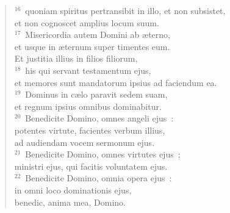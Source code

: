 \begin{verse}
${}^{16}$~quoniam spiritus pertransibit in illo, et non subsistet,\\ et non cognoscet amplius locum suum.\\
${}^{17}$~Misericordia autem Domini ab \ae terno,\\ et usque in \ae ternum super timentes eum.\\ Et justitia illius in filios filiorum,\\
${}^{18}$~his qui servant testamentum ejus,\\ et memores sunt mandatorum ipsius ad faciendum ea.\\
${}^{19}$~Dominus in c\ae lo paravit sedem suam,\\ et regnum ipsius omnibus dominabitur.\\
${}^{20}$~Benedicite Domino, omnes angeli ejus~:\\ potentes virtute, facientes verbum illius,\\ ad audiendam vocem sermonum ejus.\\
${}^{21}$~Benedicite Domino, omnes virtutes ejus~;\\ ministri ejus, qui facitis voluntatem ejus.\\
${}^{22}$~Benedicite Domino, omnia opera ejus~:\\ in omni loco dominationis ejus,\\ benedic, anima mea, Domino.\end{verse}



